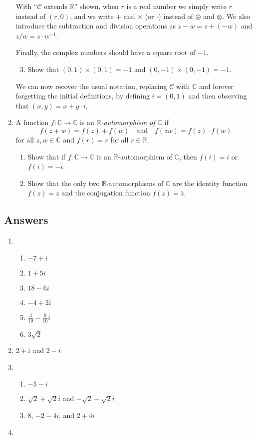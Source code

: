 \begin{enumerate}
\begin{enumerate}
\end{enumerate}
With ``$\mathcal{C}$ extends $\mathbb{R}$'' shown, when $r$ is a real number we simply write $r$ instead of $(r,0)$, and we write $+$ and $\times$ (or $\cdot$) instead of $\oplus$ and $\otimes$. We also introduce the subtraction and division operations as $z - w = z + (-w)$ and $z/w = z\cdot w^{-1}$.\par
Finally, the complex numbers should have a square root of $-1$.
\begin{enumerate}\setcounter{enumii}{2}
\item Show that $(0,1)\times (0,1) = -1$ and $(0,-1)\times (0,-1) = -1$.
\end{enumerate}
We can now recover the usual notation, replacing $\mathcal{C}$ with $\mathbb{C}$ and forever forgetting the initial definitions, by defining $i = (0,1)$ and then observing that $(x,y) = x + y\cdot i$.
\item A function $f:\mathbb{C}\to\mathbb{C}$ is an \emph{$\mathbb{R}$-automorphism of $\mathbb{C}$} if
\begin{equation*}
f(z + w) = f(z) + f(w)\quad\text{and}\quad f(zw) = f(z)\cdot f(w)
\end{equation*}
for all $z,w\in\mathbb{C}$ and $f(r) = r$ for all $r\in\mathbb{R}$.
\begin{enumerate}
\item Show that if $f:\mathbb{C}\to\mathbb{C}$ is an $\mathbb{R}$-automorphism of $\mathbb{C}$, then $f(i) = i$ or $f(i) = -i$.
\item Show that the only two $\mathbb{R}$-automorphisms of $\mathbb{C}$ are the identity function $f(z) = z$ and the conjugation function $f(z) = \bar{z}$.
\end{enumerate}
\end{enumerate}


\newpage
\subsection{Answers}

\begin{enumerate}
\item \begin{enumerate}
\item $-7 + i$
\item $1 + 5i$
\item $18 - 6i$
\item $-4 + 2i$
\item $\frac{3}{10} - \frac{9}{10}i$
\item $3\sqrt{2}$
\end{enumerate}
\item $2 + i$ and $2 - i$
\item \begin{enumerate}
\item $-5 - i$
\item $\sqrt{2} + \sqrt{2}i$ and $-\sqrt{2} - \sqrt{2}i$
\item $8$, $-2 - 4i$, and $2 + 4i$
\end{enumerate}
\item 
\end{enumerate}